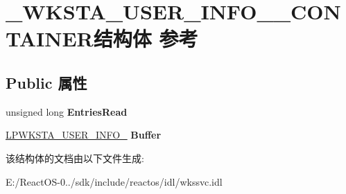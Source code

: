 \hypertarget{struct___w_k_s_t_a___u_s_e_r___i_n_f_o__0___c_o_n_t_a_i_n_e_r}{}\section{\+\_\+\+W\+K\+S\+T\+A\+\_\+\+U\+S\+E\+R\+\_\+\+I\+N\+F\+O\+\_\+\_\+\+C\+O\+N\+T\+A\+I\+N\+E\+R结构体 参考}
\label{struct___w_k_s_t_a___u_s_e_r___i_n_f_o__0___c_o_n_t_a_i_n_e_r}
\subsection*{Public 属性}
\begin{DoxyCompactItemize}
\item 
\mbox{\label{struct___w_k_s_t_a___u_s_e_r___i_n_f_o__0___c_o_n_t_a_i_n_e_r_a3dba4992c3e8f699a27192ac11c5f672}} 
unsigned long {\bfseries Entries\+Read}
\item 
\mbox{\label{struct___w_k_s_t_a___u_s_e_r___i_n_f_o__0___c_o_n_t_a_i_n_e_r_ad051ebe862a3d14d871ad72c145b7b52}} 
\hyperlink{struct___w_k_s_t_a___u_s_e_r___i_n_f_o__0}{L\+P\+W\+K\+S\+T\+A\+\_\+\+U\+S\+E\+R\+\_\+\+I\+N\+F\+O\+\_} {\bfseries Buffer}
\end{DoxyCompactItemize}


该结构体的文档由以下文件生成\+:\begin{DoxyCompactItemize}
\item 
E\+:/\+React\+O\+S-\/0../sdk/include/reactos/idl/wkssvc.\+idl\end{DoxyCompactItemize}
